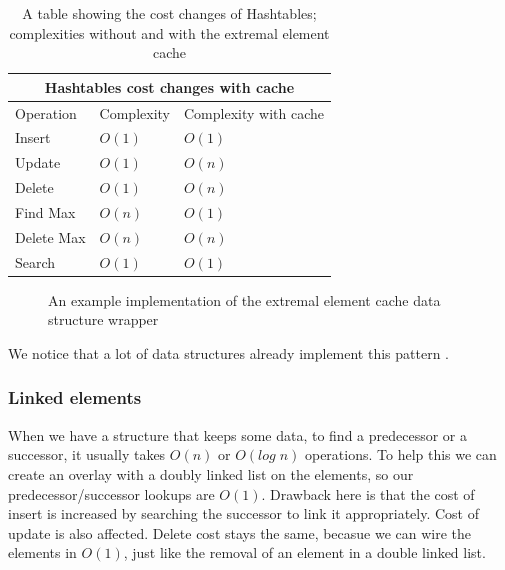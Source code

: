 \documentclass[a4paper,11pt]{article}
\begin{document}
				\begin{table}[h!]
				\centering
				\begin{tabular}{|l|l|l|}
					\hline
					\multicolumn{3}{|c|}{Hashtables cost changes with cache} \\
					\hline
					Operation & Complexity & Complexity with cache \\
					\hline
					Insert 	        & $O(1)$ & $O(1)$ \\
					Update          & $O(1)$ & {\color{red}$O(n)$} \\
					Delete	        & $O(1)$ & {\color{red}$O(n)$} \\
					Find Max 	& $O(n)$ & {\color{darkgreen}$O(1)$}\\
					Delete Max	& $O(n)$ & $O(n)$ \\
					Search 		& $O(1)$ & $O(1)$ \\
					\hline
				\end{tabular}
				\caption{A table showing the cost changes of Hashtables; complexities without and with the
				extremal element cache}
				\label{tab:rbt-cost-change}
			\end{table}

			\begin{figure}
				

				\caption{An example implementation of the extremal element cache data structure wrapper}

				\label{fig:elem-cache}
			\end{figure}

			We notice that a lot of data structures already implement this pattern \cite{Wiveb}.

        \subsubsection{Linked elements}\label{sec:gdsm:le}

			When we have a structure that keeps some data, to find a predecessor or a successor, it usually
			takes $O(n)$ or $O(log \; n)$ operations.  To help this we can create an overlay with a doubly
			linked list on the elements, so our predecessor/successor lookups are $O(1)$. Drawback here is
			that the cost of insert is increased by searching the successor to link it appropriately. Cost of
			update is also affected. Delete cost stays the same, becasue we can wire the elements in $O(1)$, 
			just like the removal of an element in a double linked list.
\end{document}
